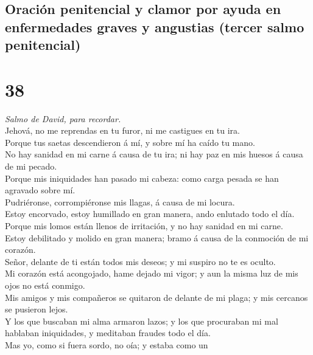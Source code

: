 \hypertarget{oraciuxf3n-penitencial-y-clamor-por-ayuda-en-enfermedades-graves-y-angustias-tercer-salmo-penitencial}{%
\subsection{Oración penitencial y clamor por ayuda en enfermedades
graves y angustias (tercer salmo
penitencial)}\label{oraciuxf3n-penitencial-y-clamor-por-ayuda-en-enfermedades-graves-y-angustias-tercer-salmo-penitencial}}

\hypertarget{section-37}{%
\section{38}\label{section-37}}

 \emph{Salmo de David, para recordar.}\\
Jehová, no me reprendas en tu furor, ni me castigues en tu ira.\\
 Porque tus saetas descendieron á mí, y sobre mí ha caído tu
mano.\\
 No hay sanidad en mi carne á causa de tu ira; ni hay paz en
mis huesos á causa de mi pecado.\\
 Porque mis iniquidades han pasado mi cabeza: como carga
pesada se han agravado sobre mí.\\
 Pudriéronse, corrompiéronse mis llagas, á causa de mi
locura.\\
 Estoy encorvado, estoy humillado en gran manera, ando
enlutado todo el día.\\
 Porque mis lomos están llenos de irritación, y no hay
sanidad en mi carne.\\
 Estoy debilitado y molido en gran manera; bramo á causa de
la conmoción de mi corazón.\\
 Señor, delante de ti están todos mis deseos; y mi suspiro
no te es oculto.\\
 Mi corazón está acongojado, hame dejado mi vigor; y aun la
misma luz de mis ojos no está conmigo.\\
 Mis amigos y mis compañeros se quitaron de delante de mi
plaga; y mis cercanos se pusieron lejos.\\
 Y los que buscaban mi alma armaron lazos; y los que
procuraban mi mal hablaban iniquidades, y meditaban fraudes todo el
día.\\
 Mas yo, como si fuera sordo, no oía; y estaba como un
